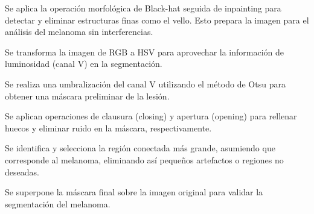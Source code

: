 \begin{seriate}

    \item Se aplica la operación morfológica de Black-hat seguida de inpainting para detectar y eliminar estructuras finas como el vello. Esto prepara la imagen para el análisis del melanoma sin interferencias.
    
    \item Se transforma la imagen de RGB a HSV para aprovechar la información de luminosidad (canal V) en la segmentación.
    
    \item Se realiza una umbralización del canal V utilizando el método de Otsu para obtener una máscara preliminar de la lesión.
    
    \item Se aplican operaciones de clausura (closing) y apertura (opening) para rellenar huecos y eliminar ruido en la máscara, respectivamente.
    
    \item Se identifica y selecciona la región conectada más grande, asumiendo que corresponde al melanoma, eliminando así pequeños artefactos o regiones no deseadas.
    
    \item Se superpone la máscara final sobre la imagen original para validar la segmentación del melanoma.
    
    \end{seriate}
